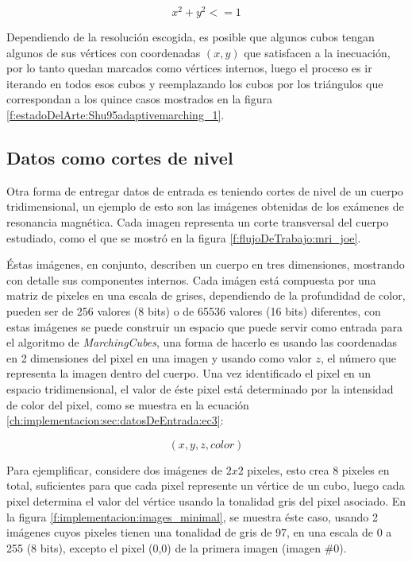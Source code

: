 \begin{equation}
\label{ch:implementacion:sec:datosDeEntrada:ec2}
	x^{2} + y^{2} <= 1
\end{equation}

Dependiendo de la resolución escogida, es posible que algunos cubos tengan algunos de sus vértices con coordenadas $(x,y)$ que satisfacen a la inecuación, por lo tanto quedan marcados como vértices internos, luego el proceso es ir iterando en todos esos cubos y reemplazando los cubos por los triángulos que correspondan a los quince casos mostrados en la figura \ref{f:estadoDelArte:Shu95adaptivemarching_1}.

\subsection{Datos como cortes de nivel}
\label{ch:implementacion:sec:datosDeEntrada:subsec:datoscomocurvasdenivel}

Otra forma de entregar datos de entrada es teniendo cortes de nivel de un cuerpo tridimensional, un ejemplo de esto son las imágenes obtenidas de los exámenes de resonancia magnética. Cada imagen representa un corte transversal del cuerpo estudiado, como el que se mostró en la figura \ref{f:flujoDeTrabajo:mri_joe}.

Éstas imágenes, en conjunto, describen un cuerpo en tres dimensiones, mostrando con detalle sus componentes internos. Cada imágen está compuesta por una matriz de pixeles en una escala de grises, dependiendo de la profundidad de color, pueden ser de 256 valores (8 bits) o de 65536 valores (16 bits) diferentes, con estas imágenes se puede construir un espacio que puede servir como entrada para el algoritmo de \emph{MarchingCubes}, una forma de hacerlo es usando las coordenadas en 2 dimensiones del pixel en una imagen y usando como valor $z$, el número que representa la imagen dentro del cuerpo. Una vez identificado el pixel en un espacio tridimensional, el valor de éste pixel está determinado por la intensidad de color del pixel, como se muestra en la ecuación \ref{ch:implementacion:sec:datosDeEntrada:ec3}:

\begin{equation}
\label{ch:implementacion:sec:datosDeEntrada:ec3}
	(x,y,z,color)
\end{equation}

Para ejemplificar, considere dos imágenes de $2x2$ pixeles, esto crea 8 pixeles en total, suficientes para que cada pixel represente un vértice de un cubo, luego cada pixel determina el valor del vértice usando la tonalidad gris del pixel asociado. En la figura \ref{f:implementacion:images_minimal}, se muestra éste caso, usando 2 imágenes cuyos pixeles tienen una tonalidad de gris de 97, en una escala de 0 a 255 (8 bits), excepto el pixel (0,0) de la primera imagen (imagen \#0).

